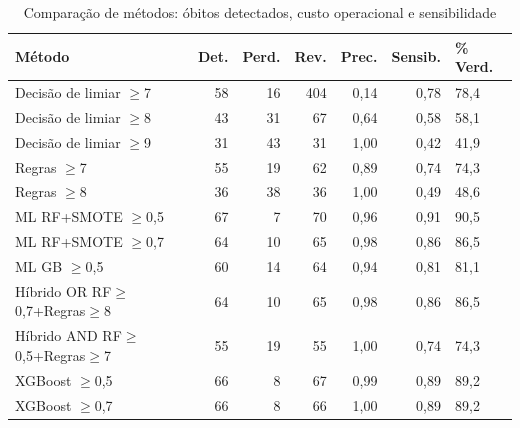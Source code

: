 \begin{table}[htbp]
\centering
\caption{Comparação de métodos: óbitos detectados, custo operacional e sensibilidade}
\label{tab:impacto-epidemiologico}
\footnotesize
\begin{tabular}{@{}lrrrrrl@{}}
\toprule
Método & Det. & Perd. & Rev. & Prec. & Sensib. & \% Verd. \\
\midrule
  Decisão de limiar $\geq$7 & 58 & 16 & 404 & 0,14 & 0,78 & 78,4 \\
  Decisão de limiar $\geq$8 & 43 & 31 & 67 & 0,64 & 0,58 & 58,1 \\
  Decisão de limiar $\geq$9 & 31 & 43 & 31 & 1,00 & 0,42 & 41,9 \\
  Regras $\geq$7 & 55 & 19 & 62 & 0,89 & 0,74 & 74,3 \\
  Regras $\geq$8 & 36 & 38 & 36 & 1,00 & 0,49 & 48,6 \\
  ML RF+SMOTE $\geq$0,5 & 67 & 7 & 70 & 0,96 & 0,91 & 90,5 \\
  ML RF+SMOTE $\geq$0,7 & 64 & 10 & 65 & 0,98 & 0,86 & 86,5 \\
  ML GB $\geq$0,5 & 60 & 14 & 64 & 0,94 & 0,81 & 81,1 \\
  Híbrido OR RF$\geq$0,7+Regras$\geq$8 & 64 & 10 & 65 & 0,98 & 0,86 & 86,5 \\
  Híbrido AND RF$\geq$0,5+Regras$\geq$7 & 55 & 19 & 55 & 1,00 & 0,74 & 74,3 \\
  XGBoost $\geq$0,5 & 66 & 8 & 67 & 0,99 & 0,89 & 89,2 \\
  XGBoost $\geq$0,7 & 66 & 8 & 66 & 1,00 & 0,89 & 89,2 \\
\bottomrule
\end{tabular}
\end{table}